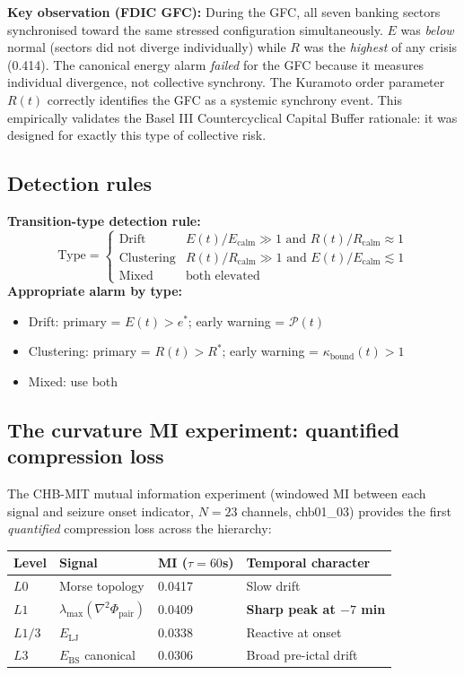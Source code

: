 \documentclass[11pt,a4paper]{article}
\theoremstyle{definition}
\begin{document}
\textbf{Key observation (FDIC GFC):}
During the GFC, all seven banking sectors synchronised toward the same
stressed configuration simultaneously. $E$ was \emph{below} normal
(sectors did not diverge individually) while $R$ was the \emph{highest}
of any crisis (0.414). The canonical energy alarm \emph{failed} for the GFC
because it measures individual divergence, not collective synchrony.
The Kuramoto order parameter $R(t)$ correctly identifies the GFC as a
systemic synchrony event. This empirically validates the Basel III
Countercyclical Capital Buffer rationale: it was designed for exactly this
type of collective risk.

\subsection{Detection rules}

\begin{lockedbox}
\textbf{Transition-type detection rule:}
\[
\text{Type} = \begin{cases}
\text{Drift} & E(t)/E_\mathrm{calm} \gg 1 \text{ and } R(t)/R_\mathrm{calm} \approx 1 \\
\text{Clustering} & R(t)/R_\mathrm{calm} \gg 1 \text{ and } E(t)/E_\mathrm{calm} \lesssim 1 \\
\text{Mixed} & \text{both elevated}
\end{cases}
\]
\textbf{Appropriate alarm by type:}
\begin{itemize}
\item Drift: primary = $E(t) > e^*$; early warning = $\mathcal{P}(t)$
\item Clustering: primary = $R(t) > R^*$; early warning = $\kappa_\mathrm{bound}(t) > 1$
\item Mixed: use both
\end{itemize}
\end{lockedbox}

\subsection{The curvature MI experiment: quantified compression loss}

The CHB-MIT mutual information experiment
(windowed MI between each signal and seizure onset indicator,
$N=23$ channels, chb01\_03) provides the first \emph{quantified}
compression loss across the hierarchy:

\begin{center}
\renewcommand{\arraystretch}{1.3}
\begin{tabular}{llll}
\toprule
\textbf{Level} & \textbf{Signal} & \textbf{MI ($\tau=60$s)} & \textbf{Temporal character} \\
\midrule
$L0$ & Morse topology & 0.0417 & Slow drift \\
$L1$ & $\lambda_\mathrm{max}(\nabla^2\Phi_\mathrm{pair})$ & 0.0409 & \textbf{Sharp peak at $-7$ min} \\
$L1/3$ & $E_\mathrm{LJ}$ & 0.0338 & Reactive at onset \\
$L3$ & $E_\mathrm{BS}$ canonical & 0.0306 & Broad pre-ictal drift \\
\bottomrule
\end{tabular}
\end{center}
\end{document}

